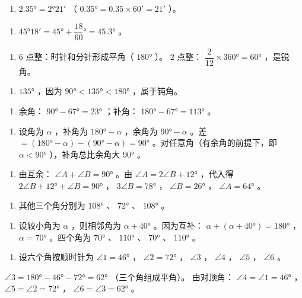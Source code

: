 \begin{answer}


\begin{enumerate}
  \item $2.35° = 2°21'$ （ $0.35° = 0.35 \times 60' = 21'$ ）。
\end{enumerate}


\begin{enumerate}
  \item $45°18' = 45° + \dfrac{18}{60}° = 45.3°$ 。
\end{enumerate}


\begin{enumerate}
  \item $6$ 点整：时针和分针形成平角（ $180°$ ）。 $2$ 点整： $\dfrac{2}{12} \times 360° = 60°$ ，是锐角。
\end{enumerate}


\begin{enumerate}
  \item $135°$ ，因为 $90° < 135° < 180°$ ，属于钝角。
\end{enumerate}


\begin{enumerate}
  \item 余角： $90° - 67° = 23°$ ；补角： $180° - 67° = 113°$ 。
\end{enumerate}


\begin{enumerate}
  \item 设角为 $\alpha$ ，补角为 $180° - \alpha$ ，余角为 $90° - \alpha$ 。差 $= (180° - \alpha) - (90° - \alpha) = 90°$ 。对任意角（有余角的前提下，即 $\alpha < 90°$ ），补角总比余角大 $90°$ 。
\end{enumerate}


\begin{enumerate}
  \item 由互余： $\angle A + \angle B = 90°$ 。由 $\angle A = 2\angle B + 12°$ ，代入得 $2\angle B + 12° + \angle B = 90°$ ， $3\angle B = 78°$ ， $\angle B = 26°$ ， $\angle A = 64°$ 。
\end{enumerate}


\begin{enumerate}
  \item 其他三个角分别为 $108°$ 、 $72°$ 、 $108°$ 。
\end{enumerate}


\begin{enumerate}
  \item 设较小角为 $\alpha$ ，则相邻角为 $\alpha + 40°$ 。因为互补： $\alpha + (\alpha + 40°) = 180°$ ， $\alpha = 70°$ 。四个角为 $70°$ 、 $110°$ 、 $70°$ 、 $110°$ 。
\end{enumerate}


\begin{enumerate}
  \item 设六个角按顺时针为 $\angle 1 = 46°$ ， $\angle 2 = 72°$ ， $\angle 3$ ， $\angle 4$ ， $\angle 5$ ， $\angle 6$ 。
\end{enumerate}

    $\angle 3 = 180° - 46° - 72° = 62°$ （三个角组成平角）。
    由对顶角： $\angle 4 = \angle 1 = 46°$ ， $\angle 5 = \angle 2 = 72°$ ， $\angle 6 = \angle 3 = 62°$ 。

\end{answer}

